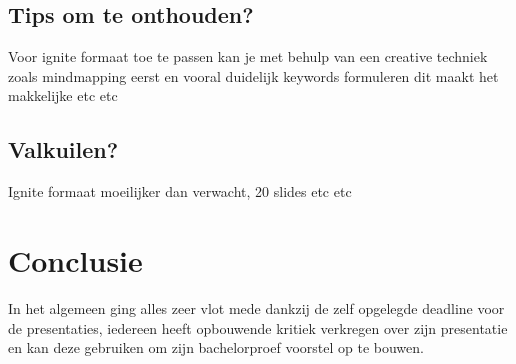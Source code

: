 \documentclass[fleqn,10pt]{voorstel}
\begin{document}
\subsection{Tips om te onthouden?}
Voor ignite formaat toe te passen kan je met behulp van een creative techniek zoals mindmapping eerst en vooral 
duidelijk keywords formuleren dit maakt het makkelijke etc etc

\subsection{Valkuilen?}
Ignite formaat moeilijker dan verwacht, 20 slides etc etc

\section{Conclusie}
In het algemeen ging alles zeer vlot mede dankzij de zelf opgelegde deadline voor de presentaties, iedereen heeft opbouwende kritiek verkregen over zijn presentatie en kan deze gebruiken om zijn bachelorproef voorstel op te bouwen. 


\end{document}
